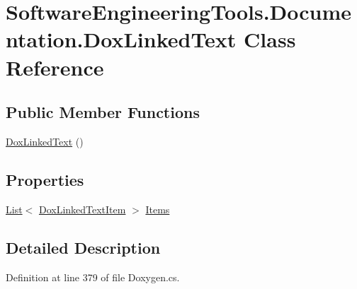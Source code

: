 \hypertarget{class_software_engineering_tools_1_1_documentation_1_1_dox_linked_text}{\section{Software\+Engineering\+Tools.\+Documentation.\+Dox\+Linked\+Text Class Reference}
\label{class_software_engineering_tools_1_1_documentation_1_1_dox_linked_text}
}
\subsection*{Public Member Functions}
\begin{DoxyCompactItemize}
\item 
\hyperlink{class_software_engineering_tools_1_1_documentation_1_1_dox_linked_text_a9097c26a79fecf802538de4c9c8cc5e4}{Dox\+Linked\+Text} ()
\end{DoxyCompactItemize}
\subsection*{Properties}
\begin{DoxyCompactItemize}
\item 
\hyperlink{namespace_software_engineering_tools_1_1_documentation_ae0bccf4f49a76db084c1c316e5954ec9a4ee29ca12c7d126654bd0e5275de6135}{List}$<$ \hyperlink{class_software_engineering_tools_1_1_documentation_1_1_dox_linked_text_item}{Dox\+Linked\+Text\+Item} $>$ \hyperlink{class_software_engineering_tools_1_1_documentation_1_1_dox_linked_text_a5e47152d5d1606b076d9b83b24340074}{Items}
\end{DoxyCompactItemize}


\subsection{Detailed Description}


Definition at line 379 of file Doxygen.\+cs.




